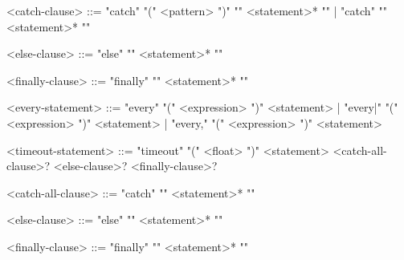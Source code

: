 \begin{bnf}
<catch-clause>
  ::= "catch" "(" <pattern> ")" "{" <statement>* "}"
    | "catch" "{" <statement>* "}"

<else-clause>
  ::= "else" "{" <statement>* "}"

<finally-clause>
  ::= "finally" "{" <statement>* "}"


<every-statement>
  ::= "every"  "(" <expression> ")" <statement>
    | "every|" "(" <expression> ")" <statement>
    | "every," "(" <expression> ")" <statement>


<timeout-statement>
::= "timeout" "(" <float> ")" <statement> <catch-all-clause>? <else-clause>? <finally-clause>?

<catch-all-clause>
::= "catch" "{" <statement>* "}"

<else-clause>
::= "else" "{" <statement>* "}"

<finally-clause>
::= "finally" "{" <statement>* "}"
\end{bnf}

